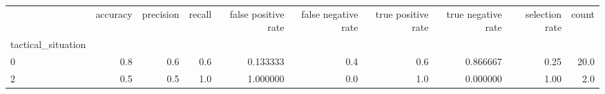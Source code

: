 \begin{tabular}{lrrrrrrrrr}
\toprule
{} &  accuracy &  precision &  recall &  false positive rate &  false negative rate &  true positive rate &  true negative rate &  selection rate &  count \\
tactical\_situation &           &            &         &                      &                      &                     &                     &                 &        \\
\midrule
0                  &       0.8 &        0.6 &     0.6 &             0.133333 &                  0.4 &                 0.6 &            0.866667 &            0.25 &   20.0 \\
2                  &       0.5 &        0.5 &     1.0 &             1.000000 &                  0.0 &                 1.0 &            0.000000 &            1.00 &    2.0 \\
\bottomrule
\end{tabular}
